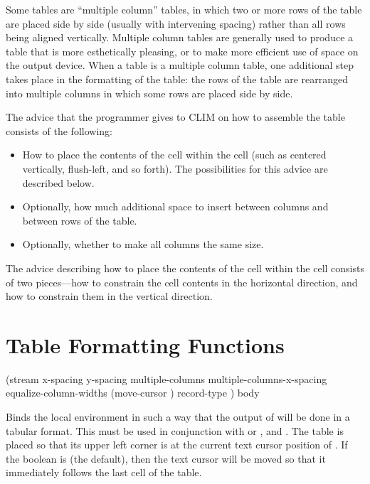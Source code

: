 Some tables are ``multiple column'' tables, in which two or more rows of the
table are placed side by side (usually with intervening spacing) rather than
all rows being aligned vertically.  Multiple column tables are generally used
to produce a table that is more esthetically pleasing, or to make more
efficient use of space on the output device.  When a table is a multiple
column table, one additional step takes place in the formatting of the table:
the rows of the table are rearranged into multiple columns in which some rows
are placed side by side.

The advice that the programmer gives to CLIM on how to assemble the table
consists of the following:
\begin{itemize}
\item How to place the contents of the cell within the cell (such as centered
vertically, flush-left, and so forth). The possibilities for this advice are
described below.

\item Optionally, how much additional space to insert between columns and
between rows of the table.

\item Optionally, whether to make all columns the same size.
\end{itemize}

The advice describing how to place the contents of the cell within the cell
consists of two pieces---how to constrain the cell contents in the horizontal
direction, and how to constrain them in the vertical direction.

\section {Table Formatting Functions}

 {(\optional stream
                               \key x-spacing y-spacing
                                    multiple-columns multiple-columns-x-spacing
                                    equalize-column-widths
                                    (move-cursor ) record-type \allow)
                              \body body}

Binds the local environment in such a way that the output of  will be done
in a tabular format.  This must be used in conjunction with 
or , and .  The table is placed so
that its upper left corner is at the current text cursor position of
.  If the boolean  is  (the default),
then the text cursor will be moved so that it immediately follows the last cell
of the table.


